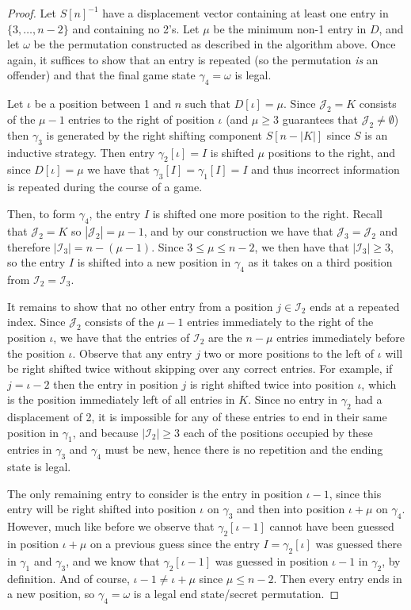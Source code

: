 \documentclass[article]{amsart}
\theoremstyle{plain}
\begin{document}
\begin{proof}
Let $S[n]^{-1}$ have a displacement vector containing at least one entry in $\{3,\dots,n-2\}$ and containing no 2's. Let $\mu$ be the minimum non-1 entry in $D$, and let $\omega$ be the permutation constructed as described in the algorithm above. Once again, it suffices to show that an entry is repeated (so the permutation \textit{is} an offender) and that the final game state $\gamma_4 = \omega$ is legal. 

Let $\iota$ be a position between 1 and $n$ such that $D[\iota] = \mu$. Since $\mathcal{J}_2 = K$ consists of the $\mu-1$ entries to the right of position $\iota$ (and $\mu \geq 3$ guarantees that $\mathcal{J}_2 \neq \emptyset$) then $\gamma_3$ is generated by the right shifting component $S[n-|K|]$ since $S$ is an inductive strategy. Then entry $\gamma_2[\iota] = I$ is shifted $\mu$ positions to the right, and since $D[\iota] = \mu$ we have that $\gamma_3[I] = \gamma_1[I] = I$ and thus incorrect information is repeated during the course of a game.

Then, to form $\gamma_4$, the entry $I$ is shifted one more position to the right. Recall that $\mathcal{J}_2 = K$ so $|\mathcal{J}_2| = \mu -1$, and by our construction we have that $\mathcal{J}_3 = \mathcal{J}_2$ and therefore $|\mathcal{I}_3| = n - (\mu - 1)$. Since $3 \leq \mu \leq n-2$, we then have that $|\mathcal{I}_3| \geq 3 $, so the entry $I$ is shifted into a new position in $\gamma_4$ as it takes on a third position from $\mathcal{I}_2 = \mathcal{I}_3$. 

It remains to show that no other entry from a position $j \in \mathcal{I}_2$ ends at a repeated index. Since $\mathcal{J}_2$ consists of the $\mu -1$ entries immediately to the right of the position $\iota$, we have that the entries of $\mathcal{I}_2$ are the $n - \mu$ entries immediately before the position $\iota$. Observe that any entry $j$ two or more positions to the left of $\iota$ will be right shifted twice without skipping over any correct entries. For example, if $j = \iota -2$ then the entry in position $j$ is right shifted twice into position $\iota$, which is the position immediately left of all entries in $K$. Since no entry in $\gamma_2$ had a displacement of 2, it is impossible for any of these entries to end in their same position in $\gamma_1$, and because $|\mathcal{I}_2| \geq 3$ each of the positions occupied by these entries in $\gamma_3$ and $\gamma_4$ must be new, hence there is no repetition and the ending state is legal.

The only remaining entry to consider is the entry in position $\iota-1$, since this entry will be right shifted into position $\iota$ on $\gamma_3$ and then into position $\iota + \mu$ on $\gamma_4$. However, much like before we observe that $\gamma_2[\iota-1]$ cannot have been guessed in position $\iota + \mu$ on a previous guess since the entry $I = \gamma_2[\iota]$ was guessed there in $\gamma_1$ and $\gamma_3$, and we know that $\gamma_2[\iota-1]$ was guessed in position $\iota-1$ in $\gamma_2$, by definition. And of course, $\iota-1 \neq \iota + \mu$ since $\mu \leq n-2$. Then every entry ends in a new position, so $\gamma_4 = \omega$ is a legal end state/secret permutation.  
\end{proof}
\end{document}
